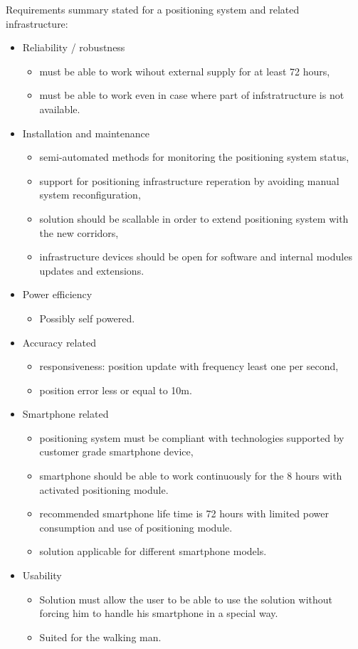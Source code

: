 \documentclass[../main.tex]{subfiles}
\begin{document}
Requirements summary stated for a positioning system and related infrastructure:
\begin{itemize}
	\item Reliability / robustness
	\begin{itemize}
		\item must be able to work wihout external supply for at least 72 hours,
		\item must be able to work even in case where part of infstratructure is not available.
	\end{itemize}
	\item Installation and maintenance
	\begin{itemize}
		\item semi-automated methods for monitoring the positioning system status,
		\item support for positioning infrastructure reperation by avoiding manual system reconfiguration,
		\item solution should be scallable in order to extend positioning system with the new corridors,
		\item infrastructure devices should be open for software and internal modules updates and extensions.
	\end{itemize}
	\item Power efficiency
	\begin{itemize}
		\item Possibly self powered.
	\end{itemize}
	\item Accuracy related
	\begin{itemize}
		\item responsiveness: position update with frequency least one per second,
		\item position error less or equal to 10m.
	\end{itemize}
	\item Smartphone related
	\begin{itemize}
		\item positioning system must be compliant with technologies supported by customer grade smartphone device,
		\item smartphone should be able to work continuously for the 8 hours with activated positioning module.
		\item recommended smartphone life time is 72 hours with limited power consumption and use of positioning module.
		\item solution applicable for different smartphone models.
	\end{itemize}
	\item Usability
	\begin{itemize}
		\item Solution must allow the user to be able to use the solution without forcing him to handle his smartphone in a special way.
		\item Suited for the walking man.
	\end{itemize}
\end{itemize}
\end{document}
